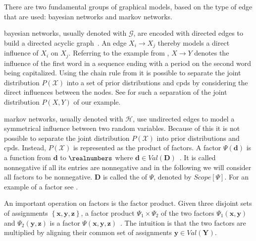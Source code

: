 There are two fundamental groups of graphical models, based on the type of edge that are used: \glspl{bayesian network} and \glspl{markov network}.

\bigskip

\Glspl{bayesian network}, usually denoted with $\mathcal{G}$, are encoded with directed \glspl{edge} to build a directed acyclic graph~\citep{koller2009probabilistic}.
An \gls{edge} $X_i\to X_j$ thereby models a direct influence of $X_i$ on $X_j$.
Referring to the example from , $X\to Y$ denotes the influence of the first word in a sequence ending with a period on the second word being capitalized.
Using the chain rule from  it is possible to separate the \gls{joint distribution} $P(\mathcal{X})$ into a set of \glspl{prior distribution} and \glspl{cpd} by considering the direct influences between the \glspl{node}.
See  for such a separation of the \gls{joint distribution} $P(X,Y)$ of our example.

\bigskip

\Glspl{markov network}, usually denoted with $\mathcal{H}$, use undirected \glspl{edge} to model a symmetrical influence between two \glspl{random variable}.
Because of this it is not possible to separate the \gls{joint distribution} $P(\mathcal{X})$ into \glspl{prior distribution} and \glspl{cpd}.
Instead, $P(\mathcal{X})$ is represented as the product of \glspl{factor}.
A \gls{factor} $\Psi(\mathbf{d})$ is a function from $\mathbf{d}$ to $\realnumbers$ where $\mathbf{d}\in Val(\mathbf{D})$~\citep{koller2009probabilistic}.
It is called nonnegative if all its entries are nonnegative and in the following we will consider all factors to be nonnegative.
$\mathbf{D}$ is called the  of $\Psi$, denoted by $Scope[\Psi]$.
For an example of a factor see .

An important operation on factors is the \gls{factor product}.
Given three disjoint sets of assignments $\left\{\mathbf{x}, \mathbf{y}, \mathbf{z}\right\}$, a \gls{factor product} $\Psi_1\times \Psi_2$ of the two factors $\Psi_1(\mathbf{x},\mathbf{y})$ and $\Psi_2(\mathbf{y},\mathbf{z})$ is a factor $\Psi(\mathbf{x},\mathbf{y},\mathbf{z})$~\citep{koller2009probabilistic}.
The intuition is that the two factors are multiplied by aligning their common set of assignments $\mathbf{y}\in Val(\mathbf{Y})$.

